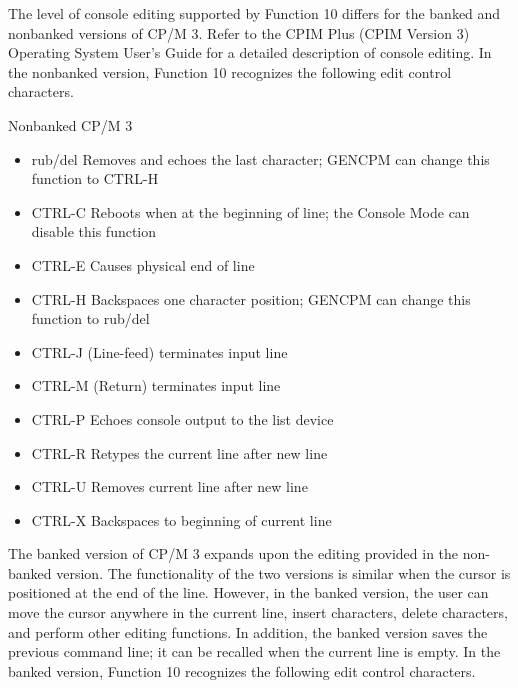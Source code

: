 The level of console editing supported by Function 10 differs for the
banked and nonbanked versions of CP/M 3. Refer to the CPIM Plus (CPIM
Version 3) Operating System User's Guide for a detailed description of
console editing. In the nonbanked version, Function 10 recognizes the
following edit control characters.

Nonbanked CP/M 3
\begin{itemize}
\item rub/del Removes and echoes the last character; GENCPM can change
  this function to CTRL-H
\item CTRL-C Reboots when at the beginning of line; the Console Mode
  can disable this function
\item CTRL-E Causes physical end of line
\item CTRL-H Backspaces one character position; GENCPM can change this
  function to rub/del
\item CTRL-J (Line-feed) terminates input line
\item CTRL-M (Return) terminates input line
\item CTRL-P Echoes console output to the list device
\item CTRL-R Retypes the current line after new line
\item CTRL-U Removes current line after new line
\item CTRL-X Backspaces to beginning of current line
\end{itemize}

The banked version of CP/M 3 expands upon the editing provided in the
non-banked version. The functionality of the two versions is similar
when the cursor is positioned at the end of the line. However, in the
banked version, the user can move the cursor anywhere in the current
line, insert characters, delete characters, and perform other editing
functions. In addition, the banked version saves the previous command
line; it can be recalled when the current line is empty. In the banked
version, Function 10 recognizes the following edit control characters.

